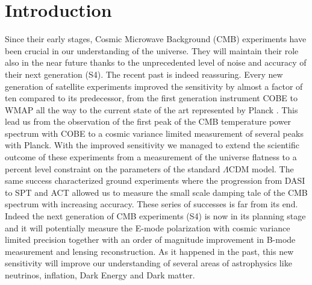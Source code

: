 \documentclass[aps,prd,reprint,superscriptaddress]{revtex4-1}
\begin{document}
\section{Introduction}\label{sec:intro}
Since their early stages, Cosmic Microwave Background (CMB) experiments have been crucial in our understanding of the universe. They will maintain their role also in the near future thanks to the unprecedented level of noise and accuracy of their next generation (S4). 
The recent past is indeed reassuring. 
Every new generation of satellite experiments improved the sensitivity by almost a factor of ten compared to its predecessor, from the first generation instrument COBE to WMAP all the way to the current state of the art represented by Planck \cite{2015arXiv150201589P,2014A&A...571A..16P,2003ApJS..148..175S,2000ApJ...545L...5H,2000Natur.404..955D}.
This lead us from the observation of the first peak of the CMB temperature power spectrum with COBE to a cosmic variance limited measurement of several peaks with Planck. With the improved sensitivity we managed to extend the scientific outcome of these experiments from a measurement of the universe flatness to a percent level constraint on the parameters of the standard $\Lambda$CDM model.
The same success characterized ground experiments where the progression from DASI \cite{2002ApJ...568...38H} to SPT and ACT \cite{2011ApJ...739...52D} \cite{2011ApJ...743...28K} allowed us to measure the small scale damping tale of the CMB spectrum with increasing accuracy.
These series of successes is far from its end. Indeed the next generation of CMB experiments (S4) is now in its planning stage and it will potentially measure the E-mode polarization with cosmic variance limited precision together with an order of magnitude improvement in B-mode measurement and lensing reconstruction.
As it happened in the past, this new sensitivity will improve our understanding of several areas of astrophysics like neutrinos, inflation, Dark Energy and Dark matter. 
\end{document}
